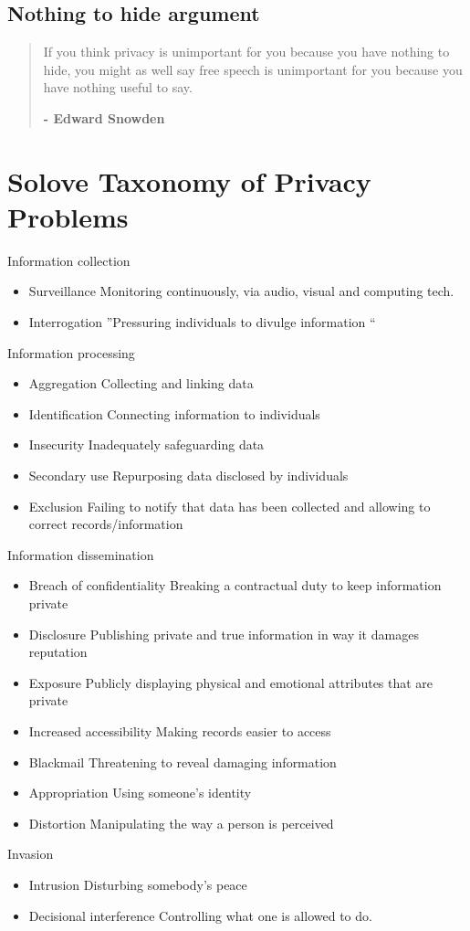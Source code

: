 \documentclass{article}
\begin{document}
\subsection{Nothing to hide argument}
\begin{quote}
If you think privacy is unimportant for you because you have nothing to hide, you might as well say free speech is unimportant for you because you have nothing useful to say.
\begin{flushright}
\textbf{- Edward Snowden}
\end{flushright}
\end{quote}

\section{Solove Taxonomy of Privacy Problems}

\begin{flushleft}
Information collection
\begin{itemize}
  \item Surveillance Monitoring continuously, via audio, visual and computing tech.
  \item Interrogation ”Pressuring individuals to divulge information “
\end{itemize}
Information processing
\begin{itemize}
  \item Aggregation Collecting and linking data
  \item Identification Connecting information to individuals
  \item Insecurity Inadequately safeguarding data
  \item Secondary use Repurposing data disclosed by individuals
  \item Exclusion Failing to notify that data has been collected and allowing to correct records/information
\end{itemize}
Information dissemination
\begin{itemize}
  \item Breach of confidentiality Breaking a contractual duty to keep information private
  \item Disclosure Publishing private and true information in way it damages reputation
  \item Exposure Publicly displaying physical and emotional attributes that are private
  \item Increased accessibility Making records easier to access
  \item Blackmail Threatening to reveal damaging information
  \item Appropriation Using someone’s identity
  \item Distortion Manipulating the way a person is perceived
\end{itemize}
Invasion
\begin{itemize}
  \item Intrusion Disturbing somebody’s peace
  \item Decisional interference Controlling what one is allowed to do.
\end{itemize}
\end{flushleft}
\end{document}
